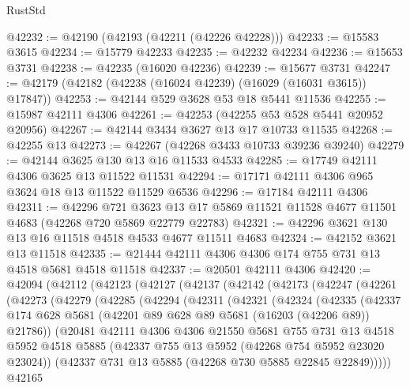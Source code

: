 \begin{lexlean}{RustStd}
\begin{coremodule}
@42232 := @42190 (@42193 (@42211 (@42226 @42228)))
@42233 := @15583 @3615
@42234 := @15779 @42233
@42235 := @42232 @42234
@42236 := @15653 @3731
@42238 := @42235 (@16020 @42236)
@42239 := @15677 @3731
@42247 := @42179 (@42182 (@42238 (@16024 @42239) (@16029 (@16031 @3615)) @17847))
@42253 := @42144 @529 @3628 @53 @18 @5441 @11536
@42255 := @15987 @42111 @4306
@42261 := @42253 (@42255 @53 @528 @5441 @20952 @20956)
@42267 := @42144 @3434 @3627 @13 @17 @10733 @11535
@42268 := @42255 @13
@42273 := @42267 (@42268 @3433 @10733 @39236 @39240)
@42279 := @42144 @3625 @130 @13 @16 @11533 @4533
@42285 := @17749 @42111 @4306 @3625 @13 @11522 @11531
@42294 := @17171 @42111 @4306 @965 @3624 @18 @13 @11522 @11529 @6536
@42296 := @17184 @42111 @4306
@42311 := @42296
    @721
    @3623
    @13
    @17
    @5869
    @11521
    @11528
    @4677
    @11501
    @4683
    (@42268 @720 @5869 @22779 @22783)
@42321 := @42296 @3621 @130 @13 @16 @11518 @4518 @4533 @4677 @11511 @4683
@42324 := @42152 @3621 @13 @11518
@42335 := @21444 @42111 @4306 @4306 @174 @755 @731 @13 @4518 @5681 @4518 @11518
@42337 := @20501 @42111 @4306
@42420 := @42094
    (@42112
      (@42123
        (@42127
          (@42137
            (@42142
              (@42173
                (@42247
                  (@42261
                    (@42273
                      (@42279
                        (@42285
                          (@42294
                            (@42311
                              (@42321
                                (@42324
                                  (@42335
                                    (@42337
                                      @174
                                      @628
                                      @5681
                                      (@42201 @89 @628 @89 @5681 (@16203 (@42206 @89)) @21786))
                                    (@20481
                                      @42111
                                      @4306
                                      @4306
                                      @21550
                                      @5681
                                      @755
                                      @731
                                      @13
                                      @4518
                                      @5952
                                      @4518
                                      @5885
                                      (@42337 @755 @13 @5952 (@42268 @754 @5952 @23020 @23024))
                                      (@42337 @731 @13 @5885 (@42268 @730 @5885 @22845 @22849)))))
                                @42165

\end{coremodule}
\end{lexlean}
